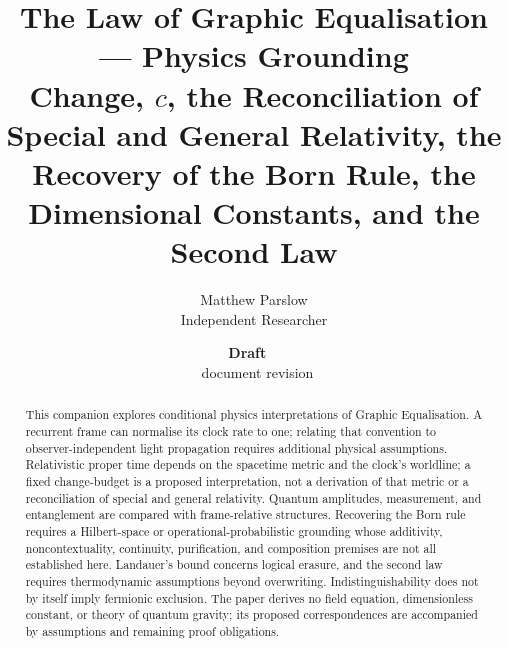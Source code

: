 \documentclass[11pt,a4paper]{article}
\title{The Law of Graphic Equalisation --- Physics Grounding\\\large Change, $c$, the Reconciliation of Special and General Relativity, the Recovery of the Born Rule, the Dimensional Constants, and the Second Law}
\author{Matthew Parslow\\Independent Researcher}
\date{\textbf{Draft \texorpdfstring{\textemdash}{---}\ \PaperDraft}\\[2pt]\PaperDisplayDate \texorpdfstring{\textbullet}{\textperiodcentered}\ document revision \PaperRevision}
\theoremstyle{remark}\newtheorem{remark}[definition]{Remark}
\begin{document}
\maketitle
\begin{center}
\end{center}
\vspace{1em}

\begin{abstract}
This companion explores conditional physics interpretations of Graphic Equalisation.
A recurrent frame can normalise its clock rate to one; relating that convention to
observer-independent light propagation requires additional physical assumptions.
Relativistic proper time depends on the spacetime metric and the clock's worldline;
a fixed change-budget is a proposed interpretation, not a derivation of that metric
or a reconciliation of special and general relativity. Quantum amplitudes, measurement,
and entanglement are compared with frame-relative structures. Recovering the Born
rule requires a Hilbert-space or operational-probabilistic grounding whose additivity,
noncontextuality, continuity, purification, and composition premises are not all
established here. Landauer's bound concerns logical erasure, and the second law
requires thermodynamic assumptions beyond overwriting. Indistinguishability does
not by itself imply fermionic exclusion. The paper derives no field equation,
dimensionless constant, or theory of quantum gravity; its proposed correspondences
are accompanied by assumptions and remaining proof obligations.
\end{abstract}
\end{document}
